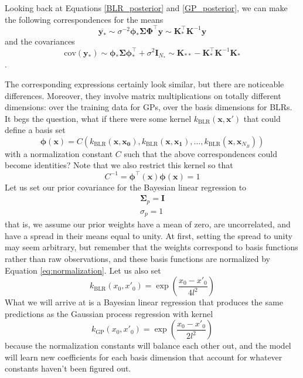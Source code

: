 \documentclass{article}
\begin{document}
Looking back at Equations \ref{BLR_posterior} and \ref{GP_posterior}, we can make the following correspondences for the means
\begin{equation}
    \overline{\mathbf{y}_\ast}\sim\sigma^{-2}\boldsymbol{\phi}_\ast \boldsymbol{\Sigma} \boldsymbol{\Phi}^\top \mathbf{y} \sim \mathbf{K}_\ast^\top \mathbf{K}^{-1} \mathbf{y}
\end{equation}
and the covariances
\begin{equation}
   \text{cov}(\mathbf{y}_\ast) \sim \boldsymbol{\phi}_\ast\boldsymbol{\Sigma}\boldsymbol{\phi}_\ast^\top +\sigma^2 \mathbf{I}_{N_\ast}\sim \mathbf{K}_{\ast\ast} - \mathbf{K}_\ast^\top \mathbf{K}^{-1} \mathbf{K}_\ast
\end{equation}.

The corresponding expressions certainly look similar, but there are noticeable differences. Moreover, they involve matrix multiplications on totally different dimensions: over the training data for GPs, over the basis dimensions for BLRs. It begs the question, what if there were some kernel $k_\text{BLR}(\mathbf{x},\mathbf{x}')$ that could define a basis set 
\begin{equation}
    \boldsymbol{\phi}(\mathbf{x})=C(k_\text{BLR}(\mathbf{x},\mathbf{x_0}),k_\text{BLR}(\mathbf{x},\mathbf{x_1}),\dots,k_\text{BLR}(\mathbf{x},\mathbf{x}_{N_B}))
\end{equation}with a normalization constant $C$ such that the above correspondences could become identities? Note that we also restrict this kernel so that 
\begin{equation}
\label{eq:normalization}
    C^{-1} = \boldsymbol{\phi}^\top(\mathbf{x})\boldsymbol{\phi}(\mathbf{x}) = 1
\end{equation}Let us set our prior covariance for the Bayesian linear regression to
\begin{equation}
\begin{split}
   \boldsymbol{\Sigma}_p= \mathbf{I}\\\sigma_p=1
   \end{split}
\end{equation}that is, we assume our prior weights have a mean of zero, are uncorrelated, and have a spread in their means equal to unity.  At first, setting the spread to unity may seem arbitrary, but remember that the weights correspond to basis functions rather than raw observations, and these basis functions are normalized by Equation \ref{eq:normalization}. 
Let us also set 
\begin{equation}
    k_\text{BLR}(x_0,x'_0)=\exp\left(\frac{x_0-x'_0}{4l^2}\right)
\end{equation}What we will arrive at is a Bayesian linear regression that produces the same predictions as the Gaussian process regression with kernel
\begin{equation}
    k_\text{GP}(x_0,x'_0)=\exp\left(\frac{x_0-x'_0}{2l^2}\right)
\end{equation}because the normalization constants will balance each other out, and the model will learn new coefficients for each basis dimension that account for whatever constants haven't been figured out.
\end{document}
